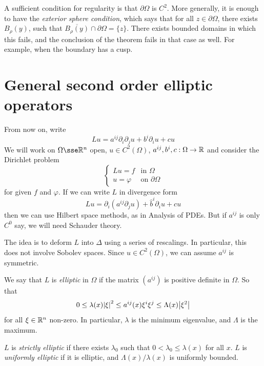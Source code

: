 \documentclass{article}
\begin{document}
\begin{remark}
    A sufficient condition for regularity is that \(\partial\Omega\) is \(C^2\). More generally, it is enough to have the \emph{exterior sphere condition}, which says that for all \(z \in \partial\Omega\), there exists \(B_\rho(y)\), such that \(\overline{B_\rho(y)} \cap \partial\Omega = \{z\}\). There exists bounded domains in which this fails, and the conclusion of the theorem fails in that case as well. For example, when the boundary has a cusp.
\end{remark}

\section{General second order elliptic operators}

From now on, write
\[Lu = a^{ij}\partial_i\partial_j u + b^i\partial_i u + cu\]
We will work on \(\Omega \sse \R^n\) open, \(u \in C^2(\Omega)\), \(a^{ij}, b^i, c : \Omega \to \mathbb{R}\) and consider the Dirichlet problem
\[\begin{cases}
    Lu = f &\text{in }\Omega \\
    u = \varphi&\text{on }\partial\Omega
\end{cases}\]
for given \(f\) and \(\varphi\). If we can write \(L\) in divergence form
\[Lu = \partial_i(a^{ij}\partial_ju) + \widehat{b}^i \partial_i u + cu\]
then we can use Hilbert space methods, as in Analysis of PDEs. But if \(a^{ij}\) is only \(C^0\) say, we will need Schauder theory.

The idea is to deform \(L\) into \(\Delta\) using a series of rescalings. In particular, this does not involve Sobolev spaces. Since \(u \in C^2(\Omega)\), we can assume \(a^{ij}\) is symmetric.

\begin{definition}
    We say that \(L\) is \emph{elliptic} in \(\Omega\) if the matrix \((a^{ij})\) is positive definite in \(\Omega\). So that
    \[0 \le \lambda(x)\abs{\xi}^2 \le a^{ij}(x)\xi^i\xi^j \le \Lambda(x)\abs{\xi^2}\]
    for all \(\xi \in \mathbb{R}^n\) non-zero. In particular, \(\lambda\) is the minimum eigenvalue, and \(\Lambda\) is the maximum.

    \(L\) is \emph{strictly elliptic} if there exists \(\lambda_0\) such that \(0 < \lambda_0 \le \lambda(x)\) for all \(x\). \(L\) is \emph{uniformly elliptic} if it is elliptic, and \(\Lambda(x)/\lambda(x)\) is uniformly bounded.
\end{definition}
\end{document}
